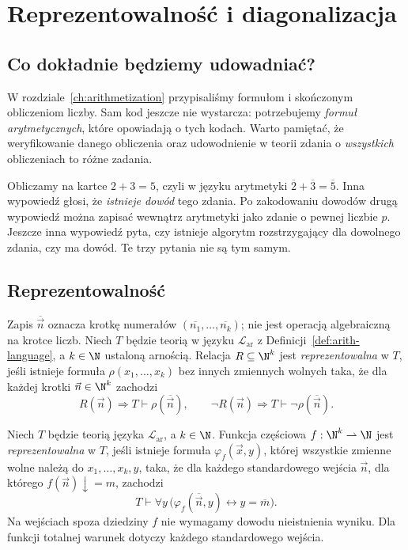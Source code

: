 \chapter{Reprezentowalność i diagonalizacja}\label{ch:representability-diagonal}

\section{Co dokładnie będziemy udowadniać?}
W rozdziale~\ref{ch:arithmetization} przypisaliśmy
formułom i skończonym obliczeniom liczby. Sam kod jeszcze
nie wystarcza: potrzebujemy \emph{formuł arytmetycznych},
które opowiadają o tych kodach. Warto pamiętać, że
weryfikowanie danego obliczenia oraz udowodnienie w teorii
zdania o \emph{wszystkich} obliczeniach to różne zadania.

\begin{przyklad}
Obliczamy na kartce $2+3=5$, czyli w języku arytmetyki
$\overline2+\overline3=\overline5$.
Inna wypowiedź głosi, że \emph{istnieje dowód} tego zdania.
Po zakodowaniu dowodów drugą wypowiedź można zapisać
wewnątrz arytmetyki jako zdanie o pewnej liczbie $p$.
Jeszcze inna wypowiedź pyta, czy istnieje algorytm
rozstrzygający dla dowolnego zdania, czy ma dowód.
Te trzy pytania nie są tym samym.
\end{przyklad}

\section{Reprezentowalność}\label{sec:reprezentowalnosc}

\begin{definicja}\label{res:7:1}
Zapis $\overline{\vec n}$ oznacza krotkę numerałów
$(\overline{n_1},\ldots,\overline{n_k})$; nie jest operacją
algebraiczną na krotce liczb.
Niech $T$ będzie teorią w języku $\mathcal L_{\mathrm{ar}}$ z Definicji~\ref{def:arith-language}, a $k\in\N$ ustaloną arnością. Relacja $R\subseteq\N^k$ jest \emph{reprezentowalna} w $T$, jeśli istnieje formuła $\rho(x_1,\ldots,x_k)$ bez innych zmiennych wolnych taka, że dla każdej krotki $\vec n\in\N^k$ zachodzi
\[
R(\vec n)\Longrightarrow T\vdash\rho(\overline{\vec n}),\qquad
\neg R(\vec n)\Longrightarrow T\vdash\neg\rho(\overline{\vec n}).
\]
\end{definicja}

\begin{definicja}\label{res:7:2}
Niech $T$ będzie teorią języka $\mathcal L_{\mathrm{ar}}$, a $k\in\N$. Funkcja częściowa $f:\N^k\rightharpoonup\N$ jest \emph{reprezentowalna} w $T$, jeśli istnieje formuła $\varphi_f(\vec x,y)$, której wszystkie zmienne wolne należą do $x_1,\ldots,x_k,y$, taka, że dla każdego standardowego wejścia $\vec n$, dla którego $f(\vec n)\downarrow=m$, zachodzi
\[
T\vdash\forall y\,\bigl(\varphi_f(\overline{\vec n},y)
\leftrightarrow y=\overline m\bigr).
\]
Na wejściach spoza dziedziny $f$ nie wymagamy dowodu nieistnienia wyniku. Dla funkcji totalnej warunek dotyczy każdego standardowego wejścia.
\end{definicja}

